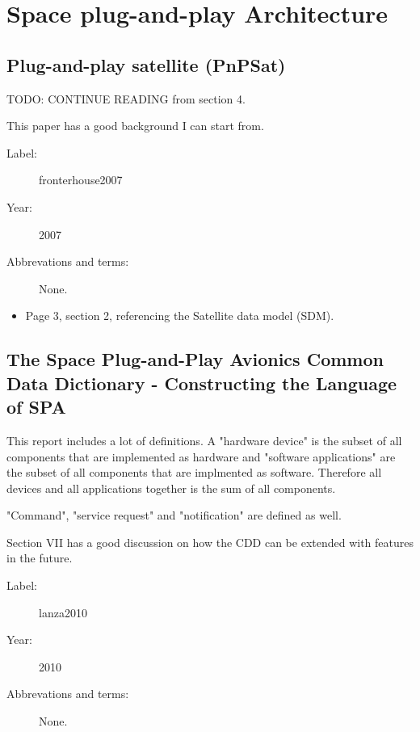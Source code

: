 \chapter{Space plug-and-play Architecture}


\section{Plug-and-play satellite (PnPSat)}

TODO: CONTINUE READING from section 4.

This paper has a good background I can start from.

\begin{description}
    \item[Label:] fronterhouse2007 \cite{fronterhouse2007}
    \item[Year:] 2007
    \item[Abbrevations and terms:] None.
\end{description}

\begin{itemize}
    \item Page 3, section 2, referencing the Satellite data model (SDM).
\end{itemize}

\section{The Space Plug-and-Play Avionics Common Data Dictionary - Constructing
the Language of SPA}

This report includes a lot of definitions. A "hardware device" is the subset of
all components that are implemented as hardware and "software applications" are
the subset of all components that are implmented as software. Therefore all
devices and all applications together is the sum of all components.

"Command", "service request" and "notification" are defined as well.

Section VII has a good discussion on how the CDD can be extended with features
in the future.

\begin{description}
    \item[Label:] lanza2010 \cite{lanza2010}
    \item[Year:] 2010
    \item[Abbrevations and terms:] None.
\end{description}

